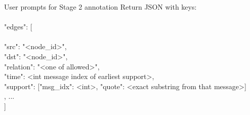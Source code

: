\begin{hypobox}{User prompts for Stage 2 annotation}
Return JSON with keys:\\
{\\
  "edges": [\\
    {\\
      "src": "<node\_id>",\\
      "dst": "<node\_id>",\\
      "relation": "<one of allowed>",\\
      "time": <int message index of earliest support>,\\
      "support": [{"msg\_idx": <int>, "quote": <exact substring from that message>}]\\
    }, ...\\
  ]\\
}\\
\end{hypobox}